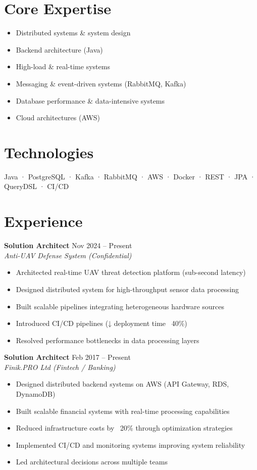 \documentclass[10pt,a4paper]{article}
\begin{document}
\section*{Core Expertise}

\begin{itemize}[leftmargin=*]
\item Distributed systems \& system design
\item Backend architecture (Java)
\item High-load \& real-time systems
\item Messaging \& event-driven systems (RabbitMQ, Kafka)
\item Database performance \& data-intensive systems
\item Cloud architectures (AWS)
\end{itemize}

\section*{Technologies}

Java · PostgreSQL · Kafka · RabbitMQ · AWS · Docker · REST · JPA · QueryDSL · CI/CD

\section*{Experience}

\textbf{Solution Architect} \hfill Nov 2024 -- Present \\
\textit{Anti-UAV Defense System (Confidential)}

\begin{itemize}[leftmargin=*]
\item Architected real-time UAV threat detection platform (sub-second latency)
\item Designed distributed system for high-throughput sensor data processing
\item Built scalable pipelines integrating heterogeneous hardware sources
\item Introduced CI/CD pipelines (↓ deployment time ~40\%)
\item Resolved performance bottlenecks in data processing layers
\end{itemize}

\textbf{Solution Architect} \hfill Feb 2017 -- Present \\
\textit{Finik.PRO Ltd (Fintech / Banking)}

\begin{itemize}[leftmargin=*]
\item Designed distributed backend systems on AWS (API Gateway, RDS, DynamoDB)
\item Built scalable financial systems with real-time processing capabilities
\item Reduced infrastructure costs by ~20\% through optimization strategies
\item Implemented CI/CD and monitoring systems improving system reliability
\item Led architectural decisions across multiple teams
\end{itemize}
\end{document}
